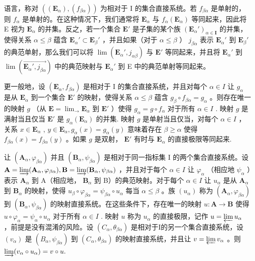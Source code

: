 语言，称对 \(((\mathbf{E}_{\alpha}), (f_{\beta \alpha}))\) 为相对于 I 的集合直接系统。若 \(f_{\beta \alpha}\) 是单射的，则 \(f_{\alpha}\) 是单射的。在这种情况下，我们通常将 \(\mathbf{E}_{\alpha}\) 与 \(f_{\alpha}(\mathbf{E}_{\alpha})\) 等同起来，因此将 E 视为 \(\mathbf{E}_{\alpha}\) 的并集。反之，若一个集合 \(\mathbf{E}'\) 是子集的某个族 \((\mathbf{E}_{\alpha}')_{\alpha \in \mathbf{I}}\) 的并集，使得关系 \(\alpha \leqslant \beta\) 蕴含 \(\mathbf{E}_{\alpha}' \subset \mathbf{E}_{\beta}'\) ，并且如果（对于 \(\alpha \leqslant \beta\) ） \(j_{\beta \alpha}\) 表示 \(\mathbf{E}_{\alpha}'\) 到 \(\mathbf{E}_{\beta}'\) 的典范单射，那么我们可以将 \(\lim (\mathbf{E}_{\alpha}', j_{\alpha \beta})\) 与 \(\mathbf{E}'\) 等同起来，并且将 \(\mathbf{E}_{\alpha}'\) 到 \(\lim (\overrightarrow{\mathbf{E}_{\alpha}', j_{\beta \alpha}})\) 中的典范映射与 \(\mathbf{E}_{\alpha}'\) 到 E 中的典范单射等同起来。

更一般地，设 \((\mathbf{E}_{\alpha}, f_{\beta \alpha})\) 是相对于 I 的集合直接系统，并且对每个 \(\alpha \in I\) 让 \(g_{\alpha}\) 是从 \(\mathbf{E}_{\alpha}\) 到一个集合 \(\mathbf{E}'\) 的映射，使得关系 \(\alpha \leqslant \beta\) 蕴含 \(g_{\beta} \circ f_{\beta \alpha} = g_{\alpha}\) 。则存在唯一的映射 \(g\) （从 \(\mathbf{E} = \lim_{\rightarrow} \mathbf{E}_{\alpha}\) 到 \(\mathbf{E}'\) ）使得 \(g_{\alpha} = g \circ f_{\alpha}\) 对于所有 \(\alpha \in I\) . 映射 \(g\) 是满射当且仅当 \(\mathbf{E}'\) 是 \(g_{\alpha}(\mathbf{E}_{\alpha})\) 的并集. 映射 \(g\) 是单射当且仅当，对每个 \(\alpha \in I\) ，关系 \(x \in \mathbf{E}_{\alpha}\) , \(y \in \mathbf{E}_{\alpha}, g_{\alpha}(x) = g_{\alpha}(y)\) 意味着存在 \(\beta \geqslant \alpha\) 使得 \(f_{\beta \alpha}(x) = f_{\beta \alpha}(y)\) 。如果 \(g\) 是双射， \(\mathbf{E}'\) 有时与 \(\mathbf{E}_{\alpha}\) 的直接极限等同起来.

让 \((\mathbf{A}_{\alpha}, \varphi_{\beta \alpha})\) 并且 \((\mathbf{B}_{\alpha}, \psi_{\beta \alpha})\) 是相对于同一指标集 I 的两个集合直接系统。设 \(\mathbf{A} = \varinjlim (\mathbf{A}_{\alpha}, \varphi_{\beta \alpha}), \mathbf{B} = \varinjlim (\mathbf{B}_{\alpha}, \psi_{\beta \alpha})\) ，并且对于每个 \(\alpha \in I\) 让 \(\varphi_{\alpha}\) （相应地 \(\psi_{\alpha}\) ）表示 \(\mathbf{A}_{\alpha}\) 到 A（相应地， \(\mathbf{B}_{\alpha}\) 到 B）的典范映射。对于每个 \(\alpha \in I\) 让 \(u_{\alpha}\) 是从 \(\mathbf{A}_{\alpha}\) 到 \(\mathbf{B}_{\alpha}\) 的映射，使得 \(u_{\beta} \circ \varphi_{\beta \alpha} = \psi_{\beta \alpha} \circ u_{\alpha}\) 每当 \(\alpha \leqslant \beta\) 。族 \((u_{\alpha})\) 称为 \((\mathbf{A}_{\alpha}, \varphi_{\beta \alpha})\) 到 \((\mathbf{B}_{\alpha}, \psi_{\beta \alpha})\) 的映射直接系统。在这些条件下，存在唯一的映射 \(u: \mathbf{A} \to \mathbf{B}\) 使得 \(u \circ \varphi_{\alpha} = \psi_{\alpha} \circ u_{\alpha}\) 对于所有 \(\alpha \in I\) . 映射 \(u\) 称为 \(u_{\alpha}\) 的直接极限，记作 \(u = \varprojlim u_{\alpha}\) ，前提是没有混淆的风险。设 \((C_{\alpha}, \theta_{\beta \alpha})\) 是相对于I的另一个集合直接系统，设 \((v_{\alpha})\) 是 \((B_{\alpha}, \psi_{\beta \alpha})\) 到 \((C_{\alpha}, \theta_{\beta \alpha})\) 的映射直接系统，并且让 \(v = \varprojlim v_{\alpha}\) 。则 \(\varinjlim (v_{\alpha} \circ u_{\alpha}) = v \circ u.\)

